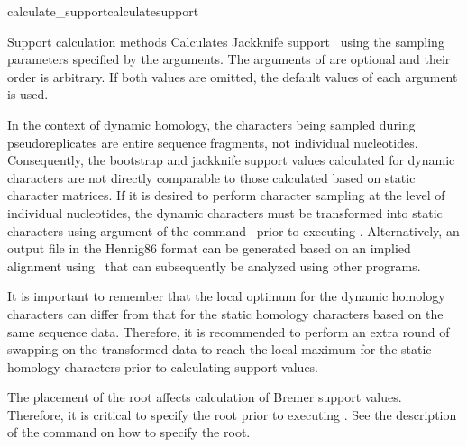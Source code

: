\begin{command}{calculate\_support}{calculatesupport}
\begin{arguments}
\begin{argumentgroup}{Support calculation methods}
                {Calculates Jackknife support~\cite{Farrisetal1996} using the 
                sampling parameters specified by the arguments. The arguments of
                 are optional and their order is arbitrary. If
                both values are omitted, the default values of each argument is used.}
                {}
        
                     \begin{statement}
                In the context of dynamic
                homology, the characters being sampled during pseudoreplicates
                are entire sequence fragments, not individual nucleotides.
                Consequently, the bootstrap and jackknife support values
                calculated for dynamic characters are not directly comparable to
                those calculated based on static character matrices. If it is
                desired to perform character sampling at the level of
                individual nucleotides, the dynamic characters must be
                transformed into static characters using 
                argument of the command~
                prior to executing .
                Alternatively, an output file in the Hennig86 format can be
                generated based on an implied alignment
                using~ that can subsequently be analyzed
                using other programs.
                                
                It is important to remember that the local optimum for the dynamic
                homology characters can differ from that for the static homology characters
                based on the same sequence data. Therefore, it is recommended to perform an extra round of swapping on the
                 transformed data to reach the local maximum for the static
                 homology characters prior to calculating support values.
            \end{statement}
          
      \begin{statement}
  	  The placement of the root affects calculation of Bremer support values.
	  Therefore, it is critical to specify the root prior to executing
	  . See the description of the
	  command  on how to specify the root.
	\end{statement}          
                       

\end{argumentgroup}
\end{arguments}
\end{command}
